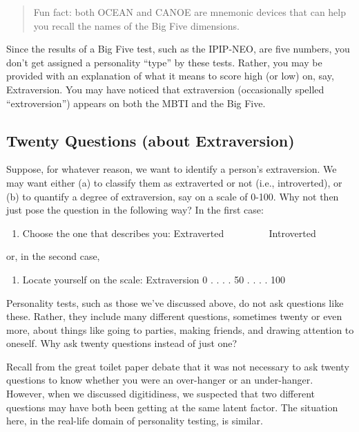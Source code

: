 \documentclass[
  openany]{book}
\providecommand{\tightlist}{%
  \setlength{\itemsep}{0pt}\setlength{\parskip}{0pt}}
\begin{document}
\begin{quote}
Fun fact: both OCEAN and CANOE are mnemonic devices that can help you recall the names of the Big Five dimensions.
\end{quote}

Since the results of a Big Five test, such as the IPIP-NEO, are five numbers, you don't get assigned a personality ``type'' by these tests. Rather, you may be provided with an explanation of what it means to score high (or low) on, say, Extraversion. You may have noticed that extraversion (occasionally spelled ``extroversion'') appears on both the MBTI and the Big Five.

\hypertarget{twenty-questions-about-extraversion}{%
\subsection*{Twenty Questions (about Extraversion)}\label{twenty-questions-about-extraversion}}

Suppose, for whatever reason, we want to identify a person's extraversion. We may want either (a) to classify them as extraverted or not (i.e., introverted), or (b) to quantify a degree of extraversion, say on a scale of 0-100. Why not then just pose the question in the following way? In the first case:

\begin{enumerate}
\def\labelenumi{\alph{enumi})}
\tightlist
\item
  Choose the one that describes you: Extraverted ~~~~\textbar{} ~~~~Introverted
\end{enumerate}

or, in the second case,

\begin{enumerate}
\def\labelenumi{\alph{enumi})}
\setcounter{enumi}{1}
\tightlist
\item
  Locate yourself on the scale: Extraversion 0 . . . . 50 . . . . 100
\end{enumerate}

Personality tests, such as those we've discussed above, do not ask questions like these. Rather, they include many different questions, sometimes twenty or even more, about things like going to parties, making friends, and drawing attention to oneself. Why ask twenty questions instead of just one?

Recall from the great toilet paper debate that it was not necessary to ask twenty questions to know whether you were an over-hanger or an under-hanger. However, when we discussed digitidiness, we suspected that two different questions may have both been getting at the same latent factor. The situation here, in the real-life domain of personality testing, is similar.
\end{document}
